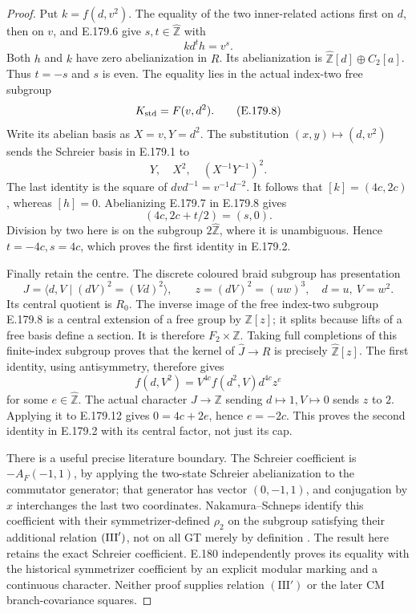 \begin{proof}
Put \(k=f(d,v^2)\).  The equality of the two
inner-related actions first on \(d\), then
on \(v\), and E.179.6 give \(s,t\in\widehat{\mathbb Z}\)
with
\[
                              k d^t h=v^s .
\tag{E.179.7}
\]
Both \(h\) and \(k\) have zero abelianization
in \(R\).  Its abelianization is
\(\widehat{\mathbb Z}[d]\oplus C_2[a]\).
Thus \(t=-s\) and \(s\) is even.
The equality lies in the actual index-two
free subgroup
\[
                       K_{\rm std}=F(v,d^2).
\tag{E.179.8}
\]
Write its abelian basis as \(X=v,Y=d^2\).
The substitution \((x,y)\mapsto(d,v^2)\)
sends the Schreier basis in E.179.1 to
\[
                       Y,\quad X^2,\quad(X^{-1}Y^{-1})^2.
\tag{E.179.9}
\]
The last identity is the square of
\(dvd^{-1}=v^{-1}d^{-2}\).
It follows that \([k]=(4c,2c)\), whereas
\([h]=0\).  Abelianizing E.179.7 in
E.179.8 gives
\[
                      (4c,2c+t/2)=(s,0).
\tag{E.179.10}
\]
Division by two here is on the subgroup
\(2\widehat{\mathbb Z}\), where it is
unambiguous.  Hence \(t=-4c,s=4c\),
which proves the first identity in E.179.2.

Finally retain the centre.  The discrete
coloured braid subgroup has presentation
\[
 J=\langle d,V\mid(dV)^2=(Vd)^2\rangle,\qquad
              z=(dV)^2=(uw)^3,\quad d=u,\ V=w^2 .
\tag{E.179.11}
\]
Its central quotient is \(R_0\).
The inverse image of the free index-two
subgroup E.179.8 is a central extension of
a free group by \(\mathbb Z[z]\); it splits
because lifts of a free basis define a
section.  It is therefore \(F_2\times\mathbb Z\).
Taking full completions of this finite-index
subgroup proves that the kernel of
\(\widehat J\to R\) is precisely
\(\widehat{\mathbb Z}[z]\).
The first identity, using antisymmetry,
therefore gives
\[
               f(d,V^2)=V^{4c}f(d^2,V)d^{4c}z^e
\tag{E.179.12}
\]
for some \(e\in\widehat{\mathbb Z}\).
The actual character \(J\to\mathbb Z\)
sending \(d\mapsto1,V\mapsto0\) sends
\(z\) to \(2\).  Applying it to E.179.12
gives \(0=4c+2e\), hence \(e=-2c\).
This proves the second identity in E.179.2
with its central factor, not just its cap.

There is a useful precise literature boundary.
The Schreier coefficient is
\(-A_F(-1,1)\), by applying the two-state
Schreier abelianization to the commutator
generator; that generator has vector
\((0,-1,1)\), and conjugation by \(x\)
interchanges the last two coordinates.
Nakamura--Schneps identify this coefficient
with their symmetrizer-defined \(\rho_2\)
on the subgroup satisfying their additional
relation \(({\rm III}')\), not on all GT
merely by definition
\cite[Definition 5.1 and Proposition 5.3,
author pp.17--18]{SymNakamuraSchneps2000}.
The result here retains the exact
Schreier coefficient.  E.180 independently proves
its equality with the historical symmetrizer
coefficient by an explicit modular marking and
a continuous character.  Neither proof supplies
relation \((\mathrm{III}\prime)\) or the later CM
branch-covariance squares.
\end{proof}

